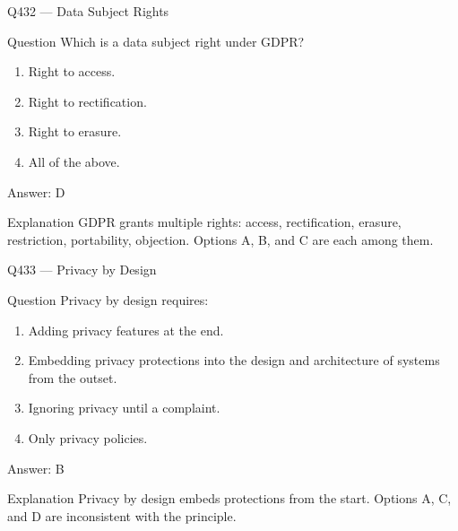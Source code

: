 \documentclass[aspectratio=169,8pt]{beamer}
\begin{document}
	\begin{frame}{Q432 --- Data Subject Rights}
		\begin{block}{Question}
			Which is a data subject right under GDPR?
			\begin{enumerate}
				\item Right to access.
				\item Right to rectification.
				\item Right to erasure.
				\item All of the above.
			\end{enumerate}
		\end{block}
		\begin{exampleblock}{Answer: D}\end{exampleblock}
		\begin{block}{Explanation}
			GDPR grants multiple rights: access, rectification, erasure, restriction, portability, objection. Options A, B, and C are each among them.
		\end{block}
	\end{frame}
	
	\begin{frame}{Q433 --- Privacy by Design}
		\begin{block}{Question}
			Privacy by design requires:
			\begin{enumerate}
				\item Adding privacy features at the end.
				\item Embedding privacy protections into the design and architecture of systems from the outset.
				\item Ignoring privacy until a complaint.
				\item Only privacy policies.
			\end{enumerate}
		\end{block}
		\begin{exampleblock}{Answer: B}\end{exampleblock}
		\begin{block}{Explanation}
			Privacy by design embeds protections from the start. Options A, C, and D are inconsistent with the principle.
		\end{block}
	\end{frame}
	
\end{document}
